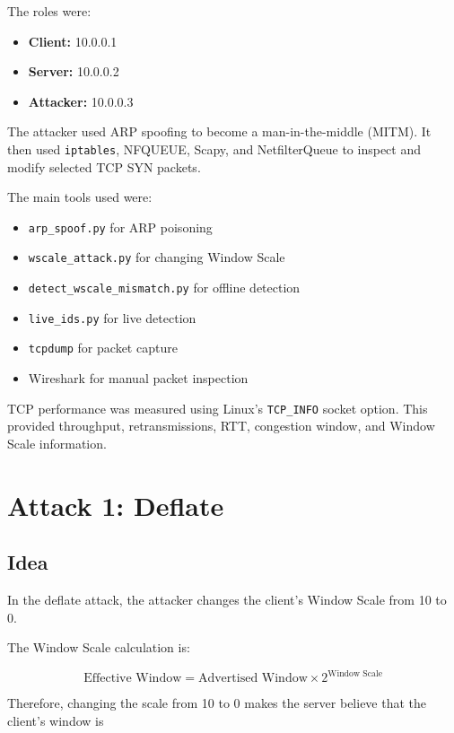 \documentclass[11pt]{article}
\begin{document}
The roles were:

\begin{itemize}
    \item \textbf{Client:} 10.0.0.1
    \item \textbf{Server:} 10.0.0.2
    \item \textbf{Attacker:} 10.0.0.3
\end{itemize}

The attacker used ARP spoofing to become a man-in-the-middle (MITM).
It then used \texttt{iptables}, NFQUEUE, Scapy, and NetfilterQueue
to inspect and modify selected TCP SYN packets.

The main tools used were:

\begin{itemize}
    \item \texttt{arp\_spoof.py} for ARP poisoning
    \item \texttt{wscale\_attack.py} for changing Window Scale
    \item \texttt{detect\_wscale\_mismatch.py} for offline detection
    \item \texttt{live\_ids.py} for live detection
    \item \texttt{tcpdump} for packet capture
    \item Wireshark for manual packet inspection
\end{itemize}

TCP performance was measured using Linux's \texttt{TCP\_INFO} socket
option. This provided throughput, retransmissions, RTT, congestion
window, and Window Scale information.

\section{Attack 1: Deflate}

\subsection{Idea}

In the deflate attack, the attacker changes the client's Window Scale
from 10 to 0.

The Window Scale calculation is:

\[
\text{Effective Window}
=
\text{Advertised Window}\times 2^{\text{Window Scale}}
\]

Therefore, changing the scale from 10 to 0 makes the server believe
that the client's window is
\end{document}
